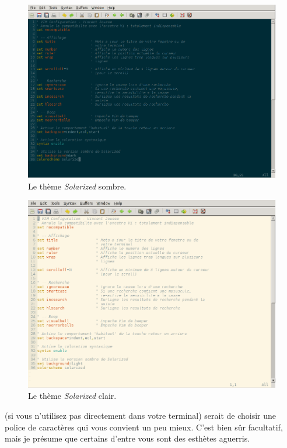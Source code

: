 \begin{figure}%
  \includegraphics[width=\linewidth]{graphics/vim-solarized-dark.png}
  \caption{Le thème \emph{Solarized} sombre.}
  \label{fig:vim-solarized-dark}
\end{figure}

\begin{figure}%
  \includegraphics[width=\linewidth]{graphics/vim-solarized-light.png}
  \caption{Le thème \emph{Solarized} clair.}
  \label{fig:vim-solarized-light}
\end{figure}

 (si vous n'utilisez pas \vim directement dans votre terminal) serait de choisir une police de caractères qui vous convient un peu mieux. C'est bien sûr facultatif, mais je présume que certains d'entre vous sont des esthètes aguerris.

